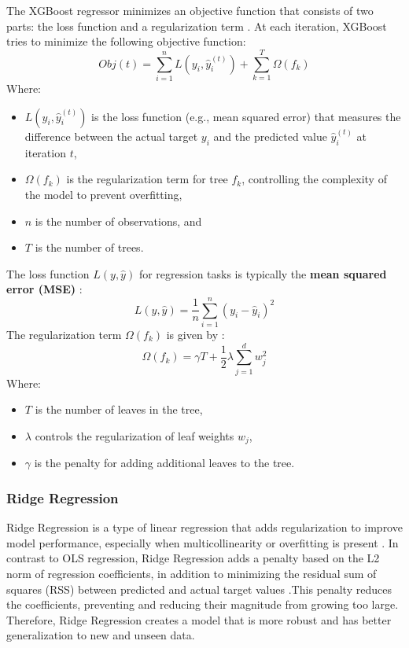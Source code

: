 \documentclass[12pt, a4paper,oneside]{book}
\numberwithin{equation}{section}
\begin{document}
The XGBoost regressor minimizes an objective function that consists of two parts: the loss function and a regularization term \cite{chen2016} \cite{hastie2009}. At each iteration, XGBoost tries to minimize the following objective function:
\[Obj(t) = \sum_{i=1}^{n} L(y_i, \hat{y}_i^{(t)}) + \sum_{k=1}^{T} \Omega(f_k)\]
Where:
\begin{itemize}
    \item \( L(y_i, \hat{y}_i^{(t)}) \) is the loss function (e.g., mean squared error) that measures the difference between the actual target \( y_i \) and the predicted value \( \hat{y}_i^{(t)} \) at iteration \( t \),
    \item \( \Omega(f_k) \) is the regularization term for tree \( f_k \), controlling the complexity of the model to prevent overfitting,
    \item \( n \) is the number of observations, and
    \item \( T \) is the number of trees.
\end{itemize}
The loss function \( L(y, \hat{y}) \) for regression tasks is typically the \textbf{mean squared error (MSE)} \cite{albert2021}:
\[L(y, \hat{y}) = \frac{1}{n} \sum_{i=1}^{n} (y_i - \hat{y}_i)^2\]
The regularization term \( \Omega(f_k) \) is given by \cite{chen2016}:
\[\Omega(f_k) = \gamma T + \frac{1}{2} \lambda \sum_{j=1}^{d} w_j^2\]
Where:
\begin{itemize}
    \item \( T \) is the number of leaves in the tree,
    \item \( \lambda \) controls the regularization of leaf weights \( w_j \),
    \item \( \gamma \) is the penalty for adding additional leaves to the tree.
\end{itemize}

\subsubsection{Ridge Regression}
Ridge Regression is a type of linear regression that adds regularization to improve model performance, especially when multicollinearity or overfitting is present \cite{hoerl1970}. In contrast to OLS regression, Ridge Regression adds a penalty based on the L2 norm of regression coefficients, in addition to minimizing the residual sum of squares (RSS) between predicted and actual target values \cite{hastie2009}.This penalty reduces the coefficients, preventing and reducing their magnitude from growing too large. Therefore, Ridge Regression creates a model that is more robust and has better generalization to new and unseen data.
\end{document}
